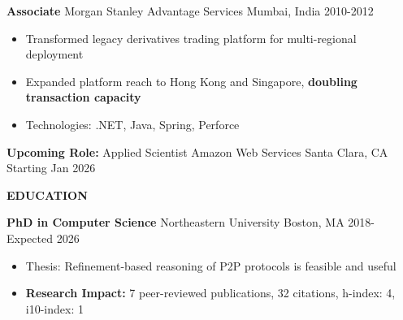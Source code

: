 \documentclass[11pt,letterpaper]{article}
\newcommand{\cvsection}[1]{
    \vspace{0.6em}
    {\color{darkblue}\textbf{\Large #1}}
    \vspace{0.15em}
    \textcolor{lightblue}{\hrulefill}
    \vspace{0.4em}
}
\newcommand{\cvsubsection}[4]{
    \textbf{#1} \textcolor{mediumgray}{\textbullet} #2 \textcolor{mediumgray}{\textbullet} #3 \textcolor{mediumgray}{\textbullet} #4
}
\begin{document}
\cvsubsection{Associate}{Morgan Stanley Advantage Services}{Mumbai, India}{2010-2012}
\begin{itemize}
    \item Transformed legacy derivatives trading platform for multi-regional deployment
    \item Expanded platform reach to Hong Kong and Singapore, \textbf{doubling transaction capacity}
    \item Technologies: .NET, Java, Spring, Perforce
\end{itemize}

\textbf{Upcoming Role:} Applied Scientist \textcolor{mediumgray}{\textbullet} Amazon Web Services \textcolor{mediumgray}{\textbullet} Santa Clara, CA \textcolor{mediumgray}{\textbullet} Starting Jan 2026

\cvsection{EDUCATION}

\textbf{PhD in Computer Science} \textcolor{mediumgray}{\textbullet} Northeastern University \textcolor{mediumgray}{\textbullet} Boston, MA \textcolor{mediumgray}{\textbullet} 2018-Expected 2026
\begin{itemize}
    \item Thesis: Refinement-based reasoning of P2P protocols is feasible and useful
    \item \textbf{Research Impact:} 7 peer-reviewed publications, 32 citations, h-index: 4, i10-index: 1
\end{itemize}
\end{document}
